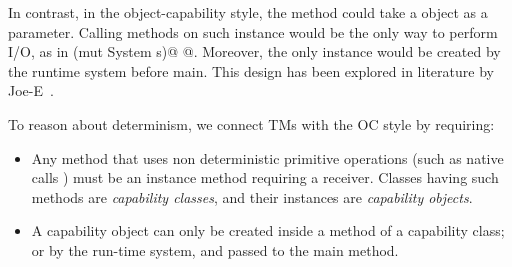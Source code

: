 In contrast, in the object-capability style, the \Q@main@ method could take a \Q@System@ object as a parameter. Calling methods on such \Q@System@ instance would be the only way to perform I/O, as in
 \Q@main(mut System s)@
 \lstset{language=Java}
@.
Moreover, the only \Q@System@ instance would be created by the runtime system before main. %
This design has been explored in literature by Joe-E~\cite{finifter2008verifiable}. %
\lstset{language=FortyTwo}

To reason about determinism, we connect TMs with the OC style by requiring:
\begin{itemize}
\item Any method that uses non deterministic primitive operations (such as native calls ) must be an instance method requiring a \Q@mut@ receiver.
Classes having such methods are \emph{capability classes}, and their instances are \emph{capability objects}.
\item A capability object can only be created inside a \Q@mut@ method of a capability class; or
by the run-time system, and passed to the main method.
\end{itemize}
